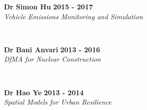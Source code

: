 \documentclass[margin]{res}
\newcommand\tab[1][1cm]{\hspace*{#1}}
\begin{document}
\begin{resume}
	\vspace{0.03in}
	\begin{minipage}{\textwidth}
	{\bf Dr Simon Hu} \hfill {\bf 2015 - 2017} \\
	\tab[0.2in] \textit{Vehicle Emissions Monitoring and Simulation}
	\end{minipage}
	\\
	\vspace{0.03in}
	\begin{minipage}{\textwidth}
	{\bf Dr Bani Anvari} \hfill {\bf 2013 - 2016} \\
	\tab[0.2in] \textit{DfMA for Nuclear Construction}
	\end{minipage}
	\\
	\vspace{0.03in}
	\begin{minipage}{\textwidth}
	{\bf Dr Hao Ye} \hfill {\bf 2013 - 2014} \\
	\tab[0.2in] \textit{Spatial Models for Urban Resilience}
	\end{minipage}
	\\

\vspace{-0.10in}

\end{resume}
\end{document}
